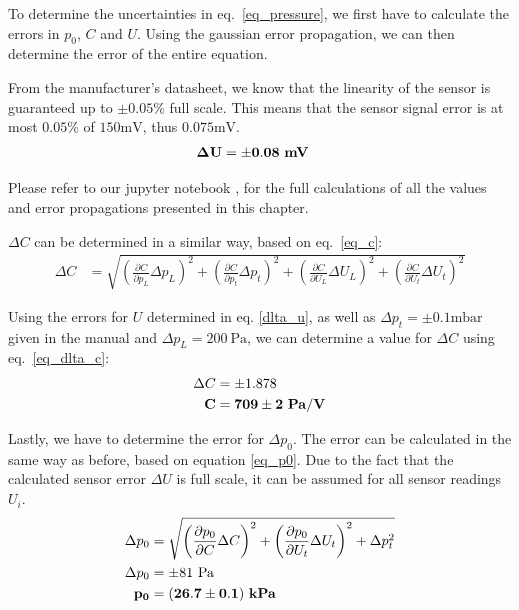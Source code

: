     To determine the uncertainties in eq.~\ref{eq_pressure}, we first have to calculate the errors in $p_0$, $C$ and $U$.
    Using the gaussian error propagation, we can then determine the error of the entire equation.


    From the manufacturer's datasheet, we know that the linearity of the sensor is guaranteed up to $\pm 0.05\%$ full scale. %
    This means that the sensor signal error is at most $0.05\%$ of $150\si{\milli\volt}$, thus $0.075\si{\milli\volt}$.
    \begin{align}
        \bf \Delta U &= \bf \pm 0.08 ~\si{\bf\milli\volt} \label{dlta_u}
    \end{align}

    Please refer to our jupyter notebook \cite{GitHub}, for the full calculations of all the values and error propagations presented in this chapter.   %

    $\Delta C$ can be determined in a similar way, based on eq.~\ref{eq_c}:
    \begin{align}
        \Delta C &= \sqrt{ \left(\frac{\partial C}{\partial p_L} \Delta p_L \right)^2 +
                        \left(\frac{\partial C}{\partial p_t} \Delta p_t \right)^2 +
                        \left(\frac{\partial C}{\partial U_L} \Delta U_L \right)^2 +
                        \left(\frac{\partial C}{\partial U_t} \Delta U_t \right)^2 } \label{eq_dlta_c}
    \end{align}

    Using the errors for $U$ determined in eq. \ref{dlta_u}, as well as $\Delta p_t = \pm 0.1 \si{\milli\bar}$ given in the manual and $\Delta p_L = 200~\si{\pascal}$,
    we can determine a value for $\Delta C$ using eq.~\ref{eq_dlta_c}:
    \begin{align}
        \Delta C &= \pm 1.878 \label{dlta_c}\\
        \bf C &= \bf 709 \pm 2 ~\si{\bf\pascal/\bf\volt}
    \end{align}

    Lastly, we have to determine the error for $\Delta p_0$. The error can be calculated in the same way as before, based on equation \ref{eq_p0}.
    Due to the fact that the calculated sensor error $\Delta U$ is full scale, it can be assumed for all sensor readings $U_i$.
    \begin{align}
        \Delta p_0 &= \sqrt{ \left(\frac{\partial p_0}{\partial C} \Delta C \right)^2 +
                            \left(\frac{\partial p_0}{\partial U_t} \Delta U_t \right)^2 +
                            \Delta p_t^2}\\
        \Delta p_0 &= \pm 81 ~\si{\pascal} \label{dlta_p0}\\
        \bf p_0 &= \bf (26.7 \pm 0.1) ~\si{\bf\kilo\pascal}
    \end{align}

